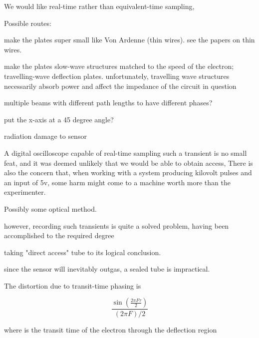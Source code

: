 

We would like real-time rather than equivalent-time sampling, 


Possible routes:

make the plates super small like Von Ardenne (thin wires). see the papers on thin wires.

make the plates slow-wave structures matched to the speed of the electron; travelling-wave deflection plates.
unfortunately, travelling wave structures necessarily absorb power and affect the impedance of the circuit in question


multiple beams with different path lengths to have different phases?

put the x-axis at a 45 degree angle?


radiation damage to sensor 

A digital oscilloscope capable of real-time sampling such a transient is no small feat, and it was deemed unlikely that we would be 
able to obtain access, There is also the concern that, when working with a system producing kilovolt 
pulses and an input of 5v, some harm might come to a machine worth more than the experimenter.

Possibly some optical method. 

however, recording such transients is quite a solved problem, having been accomplished to the required degree 

taking "direct access" tube to its logical conclusion.

since the sensor will inevitably outgas, a sealed tube is impractical.


The distortion due to transit-time phasing is

$$ \frac{\sin(\frac{2\pi F \tau}{2})}{(2\pi F)/2} $$

where \tau is the transit time of the electron through the deflection region
